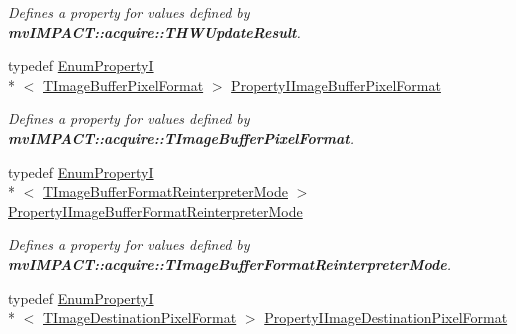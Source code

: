 \begin{DoxyCompactItemize}
\begin{DoxyCompactList}\small\item\em Defines a property for values defined by {\bfseries mv\+I\+M\+P\+A\+C\+T\+::acquire\+::\+T\+H\+W\+Update\+Result}. \end{DoxyCompactList}\item 
\hypertarget{group___common_interface_ga4f53082cdae4edfc1f87e928a0ab4184}{typedef \hyperlink{classmv_i_m_p_a_c_t_1_1acquire_1_1_enum_property_i}{Enum\+Property\+I}\\*
$<$ \hyperlink{group___common_interface_ga456e8aa76e06bb761f27c52141475985}{T\+Image\+Buffer\+Pixel\+Format} $>$ \hyperlink{group___common_interface_ga4f53082cdae4edfc1f87e928a0ab4184}{Property\+I\+Image\+Buffer\+Pixel\+Format}}\label{group___common_interface_ga4f53082cdae4edfc1f87e928a0ab4184}

\begin{DoxyCompactList}\small\item\em Defines a property for values defined by {\bfseries mv\+I\+M\+P\+A\+C\+T\+::acquire\+::\+T\+Image\+Buffer\+Pixel\+Format}. \end{DoxyCompactList}\item 
\hypertarget{group___common_interface_ga7fd91208d37ae9034d9639d64e0e0e25}{typedef \hyperlink{classmv_i_m_p_a_c_t_1_1acquire_1_1_enum_property_i}{Enum\+Property\+I}\\*
$<$ \hyperlink{group___common_interface_ga077e155accbe145213c1c34895f961f2}{T\+Image\+Buffer\+Format\+Reinterpreter\+Mode} $>$ \hyperlink{group___common_interface_ga7fd91208d37ae9034d9639d64e0e0e25}{Property\+I\+Image\+Buffer\+Format\+Reinterpreter\+Mode}}\label{group___common_interface_ga7fd91208d37ae9034d9639d64e0e0e25}

\begin{DoxyCompactList}\small\item\em Defines a property for values defined by {\bfseries mv\+I\+M\+P\+A\+C\+T\+::acquire\+::\+T\+Image\+Buffer\+Format\+Reinterpreter\+Mode}. \end{DoxyCompactList}\item 
\hypertarget{group___common_interface_ga4b749ac6f5a0ae8744177180cfa1c955}{typedef \hyperlink{classmv_i_m_p_a_c_t_1_1acquire_1_1_enum_property_i}{Enum\+Property\+I}\\*
$<$ \hyperlink{group___common_interface_ga02e0fc32ff10e0bc0f2e8b9c321d65c9}{T\+Image\+Destination\+Pixel\+Format} $>$ \hyperlink{group___common_interface_ga4b749ac6f5a0ae8744177180cfa1c955}{Property\+I\+Image\+Destination\+Pixel\+Format}}\label{group___common_interface_ga4b749ac6f5a0ae8744177180cfa1c955}


\end{DoxyCompactItemize}
